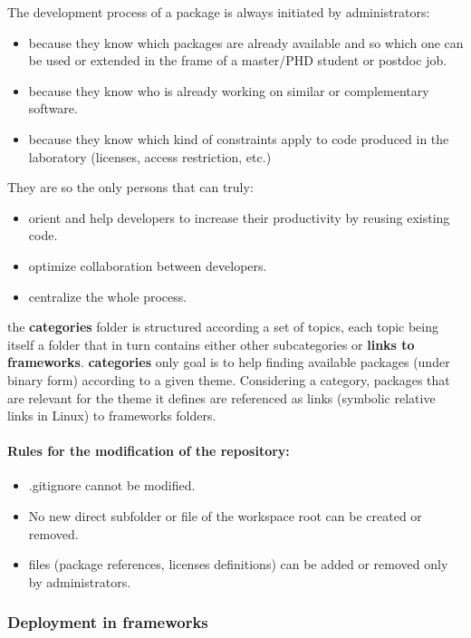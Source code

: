 \documentclass[12pt,a4paper]{article}
\begin{document}
 
The development process of a package is always initiated by administrators:
\begin{itemize}
\item because they know which packages are already available and so which one can be used or extended in the frame of a master/PHD student or postdoc job.
\item because they know who is already working on similar or complementary software.
\item because they know which kind of constraints apply to code produced in the laboratory (licenses, access restriction, etc.)
\end{itemize} 
They are so the only persons that can truly:
\begin{itemize}
\item orient and help developers to increase their productivity by reusing existing code.
\item optimize collaboration between developers.
\item centralize the whole process.
\end{itemize} 

the \textbf{categories} folder is structured according a set of topics, each topic being itself a folder that in turn contains either other subcategories or \textbf{links to frameworks}. \textbf{categories} only goal is to help finding available packages (under binary form) according to a given theme. Considering a category, packages that are relevant for the theme it defines are referenced as links (symbolic relative links in Linux) to frameworks folders.


\paragraph{Rules for the modification of the repository:}
\begin{itemize}
\item .gitignore cannot be modified.
\item No new direct subfolder or file of the workspace root can be created or removed.
\item files (package references, licenses definitions) can be added or removed only by administrators.
\end{itemize}

\subsubsection{Deployment in frameworks}
\end{document}
